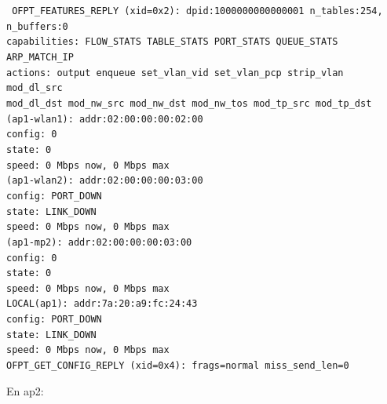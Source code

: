 \documentclass[a4paper,12pt,twoside,spanish]{book}
\begin{document}
\noindent\texttt{
\indent OFPT\_FEATURES\_REPLY (xid=0x2): dpid:1000000000000001 n\_tables:254,    \\ 
\indent \indent n\_buffers:0\\
\indent capabilities: FLOW\_STATS TABLE\_STATS PORT\_STATS QUEUE\_STATS \\ 
\indent \indent ARP\_MATCH\_IP\\
\indent actions: output enqueue set\_vlan\_vid set\_vlan\_pcp strip\_vlan mod\_dl\_src\\ 
\indent \indent mod\_dl\_dst mod\_nw\_src mod\_nw\_dst mod\_nw\_tos mod\_tp\_src mod\_tp\_dst\\
(ap1-wlan1): addr:02:00:00:00:02:00\\
\indent \indent config:     0\\
\indent \indent state:      0\\
\indent \indent speed: 0 Mbps now, 0 Mbps max\\
(ap1-wlan2): addr:02:00:00:00:03:00\\
\indent \indent config:     PORT\_DOWN\\
\indent \indent state:      LINK\_DOWN\\
\indent \indent speed: 0 Mbps now, 0 Mbps max\\
(ap1-mp2): addr:02:00:00:00:03:00\\
\indent \indent config:     0\\
\indent \indent state:      0\\
\indent \indent speed: 0 Mbps now, 0 Mbps max\\
\indent LOCAL(ap1): addr:7a:20:a9:fc:24:43\\
\indent \indent config:     PORT\_DOWN\\
\indent \indent state:      LINK\_DOWN\\
\indent \indent speed: 0 Mbps now, 0 Mbps max\\
\indent OFPT\_GET\_CONFIG\_REPLY (xid=0x4): frags=normal miss\_send\_len=0\\
}\par

En ap2:\par
\end{document}
